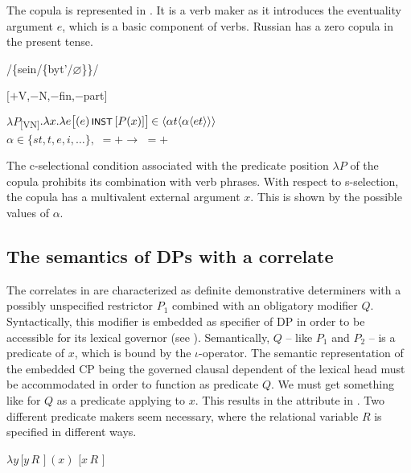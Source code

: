 \documentclass[output=paper,
colorlinks,
citecolor=brown,
newtxmath
]{langscibook}
\begin{document}
\par The copula is represented in . It is a verb maker as it introduces the eventuality argument $e$, which is a basic component of verbs. Russian has a zero copula in the present tense.

\ea\label{ex:18}
    \ea\label{ex:18a} /\big\{sein/\{byt'/$\varnothing$\}\big\}/

    \ex\label{ex:18b} $\lbrack +$V,$-$N,$-$fin,$-$part$\rbrack$

    \ex\label{ex:18c} $\lambda P$\textsubscript{[\textbeta V\textgamma N]}$. \lambda x . \lambda e \big[(e) \, \cnst{inst} \, [P (x)]\big] \, {\small \in \stb{\alpha t\stb{\alpha\stb{{et}}}}}$ \\
    {\small $\alpha{} \in \{st, t, e, i, {\ldots} \},$ \textbeta{} $= + \rightarrow$ \textgamma{} $= +$}
\z\z

\noindent The c-selectional condition associated with the predicate position $\lambda P$ of the copula prohibits its combination with verb phrases. With respect to s-selection, the copula has a multivalent external argument $x$. This is shown by the possible values of $\alpha$.


\subsection{The semantics of DPs with a correlate}\label{s:2.4}

The correlates in  are characterized as definite demonstrative determiners with a possibly unspecified restrictor $P_1$ combined with an obligatory modifier $Q$. Syntactically, this modifier is embedded as specifier of DP in order to be accessible for its lexical governor (see ). Semantically, $Q$ -- like $P_1$ and $P_2$ -- is a predicate of $x$, which is bound by the $\iota$-operator. The semantic representation of the embedded CP being the governed clausal dependent of the lexical head must be accommodated in order to function as predicate $Q$. We must get something like  for $Q$ as a predicate applying to $x$. This results in the attribute in . Two different predicate makers seem necessary, where the relational variable $R$ is specified in different ways.

\ea
\ea $\lambda y \, [ y \, R $ $] \, (x)$ \label{ex:q_1}
\ex $[x \, R$ $]$ \label{ex:q_2}
\z\z
\end{document}
